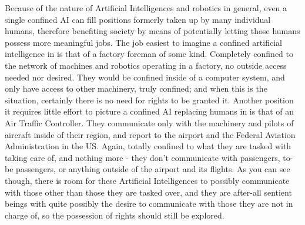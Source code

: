 Because of the nature of Artificial Intelligences and robotics in general, even a single confined AI can fill positions formerly taken up by many individual humans, therefore benefiting society by means of potentially letting those humans possess more meaningful jobs. The job easiest to imagine a confined artificial intelligence in is that of a factory foreman of some kind. Completely confined to the network of machines and robotics operating in a factory, no outside access needed nor desired. They would be confined inside of a computer system, and only have access to other machinery, truly confined; and when this is the situation, certainly there is no need for rights to be granted it. Another position it requires little effort to picture a confined AI replacing humans in is that of an Air Traffic Controller. They communicate only with the machinery and pilots of aircraft inside of their region, and report to the airport and the Federal Aviation Administration in the US. Again, totally confined to what they are tasked with taking care of, and nothing more - they don't communicate with passengers, to-be passengers, or anything outside of the airport and its flights. As you can see though, there is room for these Artificial Intelligences to possibly communicate with those other than those they are tasked over, and they are after-all sentient beings with quite possibly the desire to communicate with those they are not in charge of, so the possession of rights should still be explored.